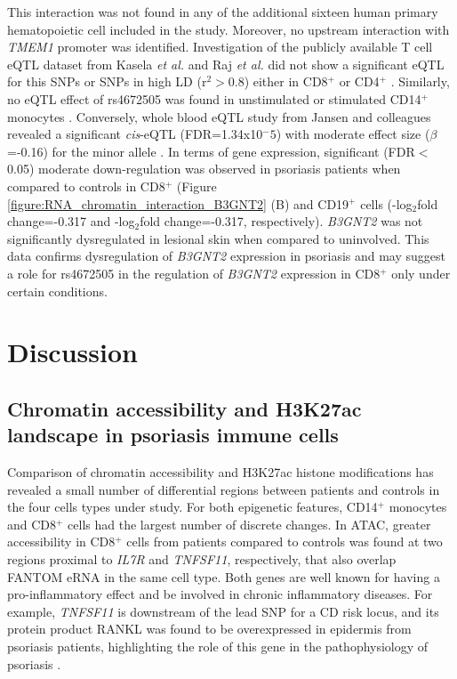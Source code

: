 This interaction was not found in any of the additional sixteen human primary hematopoietic cell included in the study. Moreover, no upstream interaction with \textit{TMEM1} promoter was identified. Investigation of the publicly available T cell eQTL dataset from Kasela \textit{et al.} and Raj \textit{et al.} did not show a significant eQTL for this SNPs or SNPs in high LD (r$^2$$>$0.8) either in CD8$^+$ or CD4$^+$ \parencite{Raj2014,Kasela2017}. Similarly, no eQTL effect of rs4672505 was found in unstimulated or stimulated CD14$^+$ monocytes \parencite{Fairfax2014}. Conversely, whole blood eQTL study from Jansen and colleagues revealed a significant \textit{cis}-eQTL (FDR=1.34x10$^-5$) with moderate effect size ($\beta$=-0.16) for the minor allele \parencite{Jansen2017}. In terms of gene expression, significant (FDR$<$0.05) moderate down-regulation was observed in psoriasis patients when compared to controls in CD8$^+$ (Figure \ref{figure:RNA_chromatin_interaction_B3GNT2} (B) and CD19$^+$ cells (-log$_2$fold change=-0.317 and -log$_2$fold change=-0.317, respectively). \textit{B3GNT2} was not significantly dysregulated in lesional skin when compared to uninvolved. This data confirms dysregulation of \textit{B3GNT2} expression in psoriasis and may suggest a role for rs4672505 in the regulation of \textit{B3GNT2} expression in CD8$^+$ only under certain conditions.  

\section{Discussion}

\subsection{Chromatin accessibility and H3K27ac landscape in psoriasis immune cells}
Comparison of chromatin accessibility and H3K27ac histone modifications has revealed a small number of differential regions between patients and controls in the four cells types under study. For both epigenetic features, CD14$^+$ monocytes and CD8$^+$ cells had the largest number of discrete changes. In ATAC, greater accessibility in CD8$^+$ cells from patients compared to controls was found at two regions proximal to \textit{IL7R} and \textit{TNFSF11}, respectively, that also overlap FANTOM eRNA in the same cell type. Both genes are well known for having a pro-inflammatory effect and be involved in chronic inflammatory diseases. For example, \textit{TNFSF11} is downstream of the lead SNP for a CD risk locus, and its protein product RANKL was found to be overexpressed in epidermis from psoriasis patients, highlighting the role of this gene in the pathophysiology of psoriasis \parencite{Toberer2011}. 

